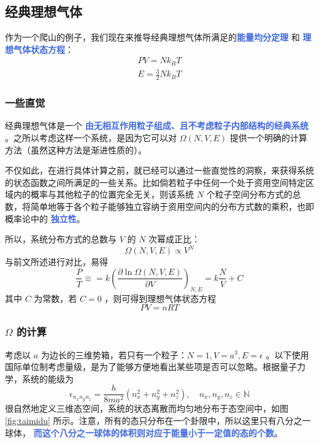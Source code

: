 \documentclass[hyperref,UTF-8]{ctexart}
\newcommand{\0}{\boldsymbol{0}}
\begin{document}
\subsection{经典理想气体}

作为一个爬山的例子，我们现在来推导经典理想气体所满足的\textcolor{RoyalBlue}{\textbf{\kaishu 能量均分定理}} 和 \textcolor{RoyalBlue}{\textbf{\kaishu 理想气体状态方程}}：
\begin{align*}
    PV = Nk_BT \\
    E = \frac{3}{2}N k_B T
\end{align*}

\subsubsection{一些直觉}

经典理想气体是一个 \textcolor{RoyalBlue}{\textbf{\kaishu 由无相互作用粒子组成、且不考虑粒子内部结构的经典系统}} 。之所以考虑这样一个系统，是因为它可以对 $\Omega(N,V,E)$ 提供一个明确的计算方法（虽然这种方法是渐进性质的）。 

不仅如此，在进行具体计算之前，就已经可以通过一些直觉性的洞察，来获得系统的状态函数之间所满足的一些关系。比如倘若粒子中任何一个处于资用空间特定区域内的概率与其他粒子的位置完全无关，则该系统  $N$ 个粒子空间分布方式的总数，将简单地等于各个粒子能够独立容纳于资用空间内的分布方式数的乘积，也即概率论中的 \textcolor{RoyalBlue}{\textbf{\kaishu 独立性}}。

所以，系统分布方式的总数与 $V$ 的 $N$ 次幂成正比：
\begin{equation}
    \Omega(N,V,E) \propto V^N
\end{equation}
与前文所述进行对比，易得
\begin{equation}
    \frac{P}{T} \equiv = k \left(\frac{\partial \ln\Omega(N,V,E)}{\partial V}\right)_{N,E} = k\frac{N}{V} + C
\end{equation}
其中 $C$ 为常数，若 $C= 0$ ，则可得到理想气体状态方程
\begin{equation}
    PV = nRT
\end{equation}

\subsubsection{$\Omega$ 的计算}

考虑以 $a$ 为边长的三维势箱，若只有一个粒子：$N =1,V = a^3, E = \epsilon$ 。以下使用国际单位制考虑量级，是为了能够方便地看出某些项是否可以忽略。根据量子力学，系统的能级为
\begin{equation}
    \epsilon_{n_xn_yn_z} = \frac{h}{8ma^2} (n_x^2 + n_y^2 + n_z^2), \quad n_x, n_y, n_z\in \mathbb{N}
\end{equation}
很自然地定义三维态空间，系统的状态离散而均匀地分布于态空间中，如图 \ref{fig:taimidu} 所示。注意，所有的态只分布在一个卦限中，所以这里只有八分之一球体， \textcolor{RoyalBlue}{\textbf{\kaishu  而这个八分之一球体的体积则对应于能量小于一定值的态的个数}}。
\end{document}

